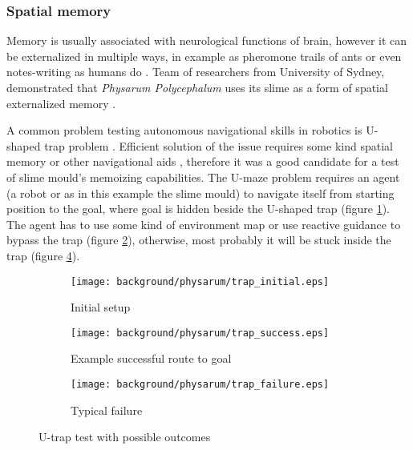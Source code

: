 \subsubsection{Spatial memory}

Memory is usually associated with neurological functions of brain, however it can be externalized in multiple ways, in example as pheromone trails of ants \cite{carroll1973ecology} or even notes-writing as humans do \cite{fisher1973effect}. Team of researchers from University of Sydney, demonstrated that \textit{Physarum Polycephalum} uses its slime as a form of spatial externalized memory \cite{reid2012slime}.

A common problem testing autonomous navigational skills in robotics is U-shaped trap problem \cite{chatterjee2001use}. Efficient solution of the issue requires some kind spatial memory or other navigational aids \cite{balch1993avoiding}, therefore it was a good candidate for a test of slime mould's memoizing capabilities. The U-maze problem requires an agent (a robot or as in this example the slime mould) to navigate itself from starting position to the goal, where goal is hidden beside the U-shaped trap (figure \ref{figure:bp_trap_model}). The agent has to use some kind of environment map or use reactive guidance to bypass the trap (figure \ref{figure:bp_trap_model_success}), otherwise, most probably it will be stuck inside the trap (figure \ref{figure:bp_trap_model_failure}).

\begin{figure}
  \centering
  \begin{subfigure}{0.33\textwidth}
    \centering
    \texttt{[image: background/physarum/trap\_initial.eps]}
    \caption{Initial setup}
    \label{figure:bp_trap_model}
  \end{subfigure}
  \begin{subfigure}{0.37\textwidth}
    \centering
    \texttt{[image: background/physarum/trap\_success.eps]}
    \caption{Example successful route to goal}
    \label{figure:bp_trap_model_success}
  \end{subfigure}
  \begin{subfigure}{0.37\textwidth}
    \centering
    \texttt{[image: background/physarum/trap\_failure.eps]}
    \caption{Typical failure}
    \label{figure:bp_trap_model_failure}
  \end{subfigure}
  \caption{U-trap test with possible outcomes}
\end{figure}

